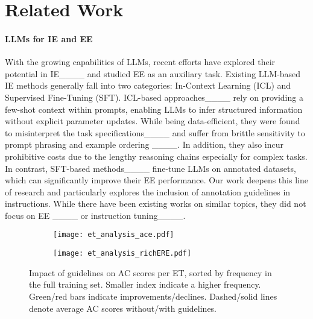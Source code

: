 \section{Related Work}
\label{sec:related-work}
\paragraph{LLMs for IE and EE} With the growing capabilities of LLMs, recent efforts have explored their potential in IE____ and studied EE as an auxiliary task. Existing LLM-based IE methods generally fall into two categories: In-Context Learning (ICL) and Supervised Fine-Tuning (SFT). ICL-based approaches____ rely on providing a few-shot context within prompts, enabling LLMs to infer structured information without explicit parameter updates. 
While being data-efficient, they were found to misinterpret the task specifications____ and suffer from brittle sensitivity to prompt phrasing and example ordering ____. In addition, they also incur prohibitive costs due to the lengthy reasoning chains especially for complex tasks.
In contrast, SFT-based methods____ fine-tune LLMs on annotated datasets, which can significantly improve their EE performance. Our work deepens this line of research and particularly explores the inclusion of annotation guidelines in instructions. While there have been existing works on similar topics, they did not focus on EE ____ or instruction tuning____.

\begin{figure}[t!]
    \centering
    \begin{subfigure}{0.49\linewidth}
        \centering
        \texttt{[image: et\_analysis\_ace.pdf]}
    \end{subfigure}
    \begin{subfigure}{0.49\linewidth}
        \centering
        \texttt{[image: et\_analysis\_richERE.pdf]}
    \end{subfigure}
    \caption{Impact of guidelines on AC scores per ET, sorted by frequency in the full training set. Smaller index indicate a higher frequency. Green/red bars indicate improvements/declines. Dashed/solid lines denote average AC scores without/with guidelines.
    }
    \label{fig:performance_by_type_frequency}
    \vspace{-12pt}
\end{figure}
